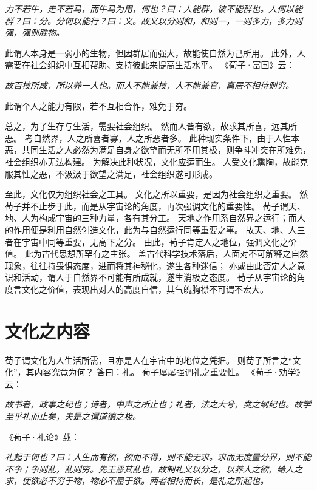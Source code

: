\documentclass[11pt]{article}
\begin{document}
\textit{力不若牛，走不若马，而牛马为用，何也？曰：人能群，彼不能群也。人何以能群？曰：分。分何以能行？曰：义。故义以分则和，和则一，一则多力，多力则强，强则胜物。}

此谓人本身是一弱小的生物，但因群居而强大，故能使自然为己所用。
此外，人需要在社会组织中互相帮助、支持彼此来提高生活水平。
《荀子·富国》云：

\textit{故百技所成，所以养一人也。而人不能兼技，人不能兼官，离居不相待则穷。}

此谓个人之能力有限，若不互相合作，难免于穷。

\par

总之，为了生存与生活，需要社会组织。
然而人皆有欲，故求其所喜，远其所恶。
考自然界，人之所喜者寡，人之所恶者多。
此种现实条件下，由于人性本恶，共同生活之人必然为满足自身之欲望而无所不用其极，则争斗冲突在所难免，社会组织亦无法构建。
为解决此种状况，文化应运而生。
人受文化熏陶，故能克服其性之恶，不汲汲于欲望之满足，社会组织遂可形成。

\par

至此，文化仅为组织社会之工具。
文化之所以重要，是因为社会组织之重要。
然荀子并不止步于此，而是从宇宙论的角度，再次强调文化的重要性。
荀子谓天、地、人为构成宇宙的三种力量，各有其分工。
天地之作用系自然界之运行；而人的作用便是利用自然创造文化，此为与自然运行同等重要之事。
故天、地、人三者在宇宙中同等重要，无高下之分。
由此，荀子肯定人之地位，强调文化之价值。
此为古代思想所罕有之主张。
盖古代科学技术落后，人面对不可解释之自然现象，往往持畏惧态度，进而将其神秘化，遂生各种迷信；
亦或由此否定人之意识和活动，谓人于自然界不可能有所成就，遂生消极之态度。
荀子从宇宙论的角度言文化之价值，表现出对人的高度自信，其气魄胸襟不可谓不宏大。

\section{文化之内容}
荀子谓文化为人生活所需，且亦是人在宇宙中的地位之凭据。
则荀子所言之“文化”，其内容究竟为何？
答曰：礼。
荀子屡屡强调礼之重要性。
《荀子·劝学》云：

\textit{故书者，政事之纪也；诗者，中声之所止也；礼者，法之大兮，类之纲纪也。故学至乎礼而止矣，夫是之谓道德之极。}

《荀子·礼论》载：

\textit{礼起于何也？曰：人生而有欲，欲而不得，则不能无求。求而无度量分界，则不能不争；争则乱，乱则穷。先王恶其乱也，故制礼义以分之，以养人之欲，给人之求，使欲必不穷于物，物必不屈于欲。两者相持而长，是礼之所起也。}
\end{document}
